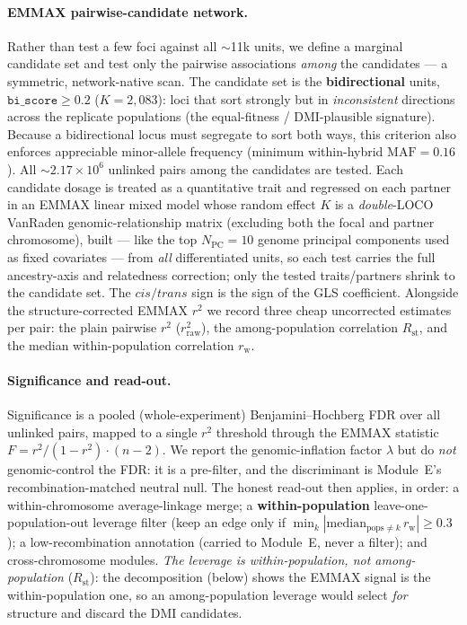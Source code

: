\documentclass[11pt]{article}
\newcommand{\Rst}{\ensuremath{R_{\mathrm{st}}}}
\newcommand{\wpr}{\ensuremath{r_{\mathrm{w}}}}
\begin{document}
\paragraph{EMMAX pairwise-candidate network.}
Rather than test a few foci against all $\sim$11k units, we define a marginal candidate set and test only
the pairwise associations \emph{among} the candidates --- a symmetric, network-native scan. The candidate set
is the \textbf{bidirectional} units, $\texttt{bi\_score}\ge0.2$ ($K=2{,}083$): loci that sort strongly but in
\emph{inconsistent} directions across the replicate populations (the equal-fitness / DMI-plausible signature).
Because a bidirectional locus must segregate to sort both ways, this criterion also enforces appreciable
minor-allele frequency (minimum within-hybrid $\mathrm{MAF}=0.16$). All $\sim$$2.17\times10^{6}$ unlinked pairs
among the candidates are tested. Each candidate dosage is treated as a quantitative trait and regressed on each
partner in an EMMAX linear mixed model whose random effect $K$ is a \emph{double}-LOCO VanRaden genomic-relationship
matrix (excluding both the focal and partner chromosome), built --- like the top $N_{\mathrm{PC}}=10$ genome
principal components used as fixed covariates --- from \emph{all} differentiated units, so each test carries the
full ancestry-axis and relatedness correction; only the tested traits/partners shrink to the candidate set. The
$cis/trans$ sign is the sign of the GLS coefficient. Alongside the structure-corrected EMMAX $r^2$ we record three
cheap uncorrected estimates per pair: the plain pairwise $r^2$ ($r^2_{\mathrm{raw}}$), the among-population
correlation \Rst, and the median within-population correlation \wpr.

\paragraph{Significance and read-out.}
Significance is a pooled (whole-experiment) Benjamini--Hochberg FDR over all unlinked pairs, mapped to a single
$r^2$ threshold through the EMMAX statistic $F=r^2/(1-r^2)\cdot(n-2)$. We report the genomic-inflation factor
$\lambda$ but do \emph{not} genomic-control the FDR: it is a pre-filter, and the discriminant is Module~E's
recombination-matched neutral null. The honest read-out then applies, in order: a within-chromosome
average-linkage merge; a \textbf{within-population} leave-one-population-out leverage filter (keep an edge only if
$\min_k |\mathrm{median}_{\text{pops}\neq k}\,\wpr| \ge 0.3$); a low-recombination annotation (carried to Module~E,
never a filter); and cross-chromosome modules. \emph{The leverage is within-population, not among-population}
(\Rst): the decomposition (below) shows the EMMAX signal is the within-population one, so an among-population
leverage would select \emph{for} structure and discard the DMI candidates.
\end{document}
